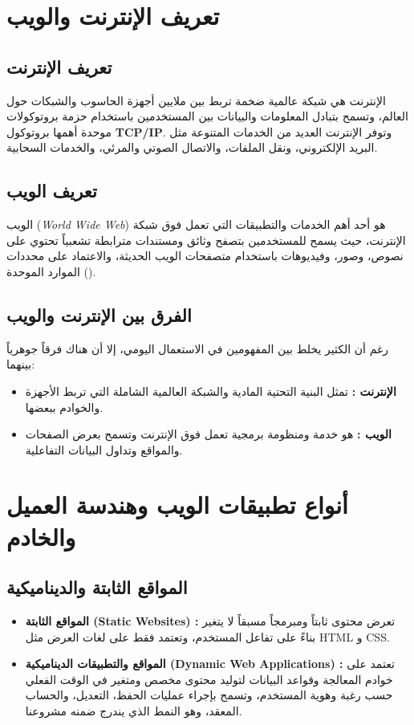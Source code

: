 \documentclass{bts-report-ar}
\begin{document}
\section{تعريف الإنترنت والويب}
\subsection{تعريف الإنترنت}
الإنترنت هي شبكة عالمية ضخمة تربط بين ملايين أجهزة الحاسوب والشبكات حول العالم، وتسمح بتبادل المعلومات والبيانات بين المستخدمين باستخدام حزمة بروتوكولات موحدة أهمها بروتوكول \textbf{TCP/IP}. وتوفر الإنترنت العديد من الخدمات المتنوعة مثل البريد الإلكتروني، ونقل الملفات، والاتصال الصوتي والمرئي، والخدمات السحابية.

\subsection{تعريف الويب}
الويب (\textit{World Wide Web}) هو أحد أهم الخدمات والتطبيقات التي تعمل فوق شبكة الإنترنت، حيث يسمح للمستخدمين بتصفح وثائق ومستندات مترابطة تشعبياً تحتوي على نصوص، وصور، وفيديوهات باستخدام متصفحات الويب الحديثة، والاعتماد على محددات الموارد الموحدة ().

\subsection{الفرق بين الإنترنت والويب}
رغم أن الكثير يخلط بين المفهومين في الاستعمال اليومي، إلا أن هناك فرقاً جوهرياً بينهما:
\begin{itemize}
  \item \textbf{الإنترنت :} تمثل البنية التحتية المادية والشبكة العالمية الشاملة التي تربط الأجهزة والخوادم ببعضها.
  \item \textbf{الويب :} هو خدمة ومنظومة برمجية تعمل فوق الإنترنت وتسمح بعرض الصفحات والمواقع وتداول البيانات التفاعلية.
\end{itemize}

\section{أنواع تطبيقات الويب وهندسة العميل والخادم}
\subsection{المواقع الثابتة والديناميكية}
\begin{itemize}
  \item \textbf{المواقع الثابتة (Static Websites) :} تعرض محتوى ثابتاً ومبرمجاً مسبقاً لا يتغير بناءً على تفاعل المستخدم، وتعتمد فقط على لغات العرض مثل HTML و CSS.
  \item \textbf{المواقع والتطبيقات الديناميكية (Dynamic Web Applications) :} تعتمد على خوادم المعالجة وقواعد البيانات لتوليد محتوى مخصص ومتغير في الوقت الفعلي حسب رغبة وهوية المستخدم، وتسمح بإجراء عمليات الحفظ، التعديل، والحساب المعقد، وهو النمط الذي يندرج ضمنه مشروعنا.
\end{itemize}
\end{document}
